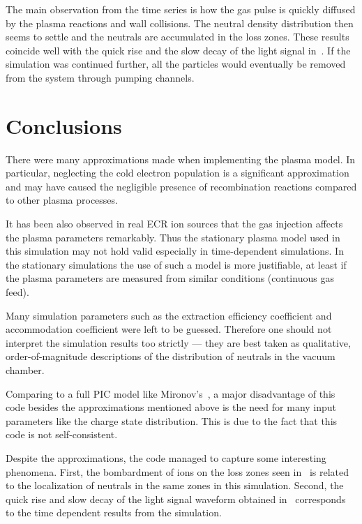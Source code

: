 \documentclass[a4paper,twoside,12pt]{article}
\begin{document}
The main observation from the time series is how the gas pulse is quickly
diffused by the plasma reactions and wall collisions. The neutral density
distribution then seems to settle and the neutrals are accumulated in the loss
zones. These results coincide well with the quick rise and the slow decay of
the light signal in~\cite{kronholm:ecr}. If the simulation was continued
further, all the particles would eventually be removed from the system through
pumping channels.

\section{Conclusions}

There were many approximations made when implementing the plasma model.
In particular, neglecting the cold electron population is a significant
approximation and may have caused the negligible presence of
recombination reactions compared to other plasma processes.

It has been also observed in real ECR ion sources that the gas injection
affects the plasma parameters remarkably. Thus the stationary plasma model used
in this simulation may not hold valid especially in time-dependent simulations.
In the stationary simulations the use of such a model is more justifiable, at
least if the plasma parameters are measured from similar conditions (continuous
gas feed).

Many simulation parameters such as the extraction efficiency coefficient and
accommodation coefficient were left to be guessed. Therefore one should not
interpret the simulation results too strictly --- they are best taken as
qualitative, order-of-magnitude descriptions of the distribution of neutrals in
the vacuum chamber.

Comparing to a full PIC model like Mironov's~\cite{mironov:ecr}, a major
disadvantage of this code besides the approximations mentioned above is the
need for many input parameters like the charge state distribution. This is due
to the fact that this code is not self-consistent.

Despite the approximations, the code managed to capture some interesting
phenomena. First, the bombardment of ions on the loss zones seen
in~\cite{kalvas:hiisi} is related to the localization of neutrals in the same
zones in this simulation. Second, the quick rise and slow decay of the light
signal waveform obtained in~\cite{kronholm:ecr} corresponds to the time
dependent results from the simulation.
\end{document}
